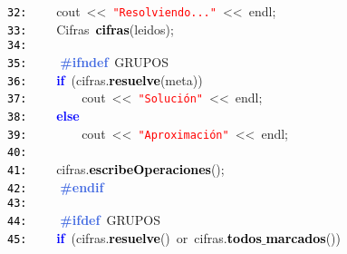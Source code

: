 \documentclass[a4paper,10pt]{scrartcl}
\begin{document}
{   \mbox{}\texttt{\textcolor{Black}{32:}} \ \ \ \ cout\ \textcolor{BrickRed}{\textless{}\textless{}}\ \texttt{\textcolor{Red}{"{}Resolviendo..."{}}}\ \textcolor{BrickRed}{\textless{}\textless{}}\ endl\textcolor{BrickRed}{;} \\
   \mbox{}\texttt{\textcolor{Black}{33:}} \ \ \ \ \textcolor{TealBlue}{Cifras}\ \textbf{\textcolor{Black}{cifras}}\textcolor{BrickRed}{(}leidos\textcolor{BrickRed}{);} \\
   \mbox{}\texttt{\textcolor{Black}{34:}}  \\
   \mbox{}\texttt{\textcolor{Black}{35:}} \textbf{\textcolor{RoyalBlue}{\ \ \ \ \#ifndef}}\ GRUPOS \\
   \mbox{}\texttt{\textcolor{Black}{36:}} \ \ \ \ \textbf{\textcolor{Blue}{if}}\ \textcolor{BrickRed}{(}cifras\textcolor{BrickRed}{.}\textbf{\textcolor{Black}{resuelve}}\textcolor{BrickRed}{(}meta\textcolor{BrickRed}{))} \\
   \mbox{}\texttt{\textcolor{Black}{37:}} \ \ \ \ \ \ \ \ cout\ \textcolor{BrickRed}{\textless{}\textless{}}\ \texttt{\textcolor{Red}{"{}Solución"{}}}\ \textcolor{BrickRed}{\textless{}\textless{}}\ endl\textcolor{BrickRed}{;} \\
   \mbox{}\texttt{\textcolor{Black}{38:}} \ \ \ \ \textbf{\textcolor{Blue}{else}} \\
   \mbox{}\texttt{\textcolor{Black}{39:}} \ \ \ \ \ \ \ \ cout\ \textcolor{BrickRed}{\textless{}\textless{}}\ \texttt{\textcolor{Red}{"{}Aproximación"{}}}\ \textcolor{BrickRed}{\textless{}\textless{}}\ endl\textcolor{BrickRed}{;} \\
   \mbox{}\texttt{\textcolor{Black}{40:}} \ \ \ \  \\
   \mbox{}\texttt{\textcolor{Black}{41:}} \ \ \ \ cifras\textcolor{BrickRed}{.}\textbf{\textcolor{Black}{escribeOperaciones}}\textcolor{BrickRed}{();} \\
   \mbox{}\texttt{\textcolor{Black}{42:}} \textbf{\textcolor{RoyalBlue}{\ \ \ \ \#endif}} \\
   \mbox{}\texttt{\textcolor{Black}{43:}}  \\
   \mbox{}\texttt{\textcolor{Black}{44:}} \textbf{\textcolor{RoyalBlue}{\ \ \ \ \#ifdef}}\ GRUPOS \\
   \mbox{}\texttt{\textcolor{Black}{45:}} \ \ \ \ \textbf{\textcolor{Blue}{if}}\ \textcolor{BrickRed}{(}cifras\textcolor{BrickRed}{.}\textbf{\textcolor{Black}{resuelve}}\textcolor{BrickRed}{()}\ \textcolor{TealBlue}{or}\ cifras\textcolor{BrickRed}{.}\textbf{\textcolor{Black}{todos$\_$marcados}}\textcolor{BrickRed}{())} \\
}
\end{document}
